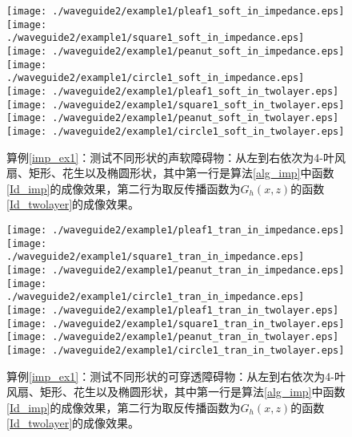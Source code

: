 \begin{figure}[h]
  \centering
  \texttt{[image: ./waveguide2/example1/pleaf1\_soft\_in\_impedance.eps]}
  \texttt{[image: ./waveguide2/example1/square1\_soft\_in\_impedance.eps]}
  \texttt{[image: ./waveguide2/example1/peanut\_soft\_in\_impedance.eps]}{\tiny }
  \texttt{[image: ./waveguide2/example1/circle1\_soft\_in\_impedance.eps]}\\
  \texttt{[image: ./waveguide2/example1/pleaf1\_soft\_in\_twolayer.eps]}
  \texttt{[image: ./waveguide2/example1/square1\_soft\_in\_twolayer.eps]}
  \texttt{[image: ./waveguide2/example1/peanut\_soft\_in\_twolayer.eps]}
  \texttt{[image: ./waveguide2/example1/circle1\_soft\_in\_twolayer.eps]}
  \caption{算例\ref{imp_ex1}：测试不同形状的声软障碍物：从左到右依次为4-叶风扇、矩形、花生以及椭圆形状，其中第一行是算法\ref{alg_imp}中函数\ref{Id_imp}的成像效果，第二行为取反传播函数为$G_h(x,z)$的函数\ref{Id_twolayer}的成像效果。}\label{fig_imp_ex1_1}
\end{figure}
\begin{figure}[h]
	\centering
	\texttt{[image: ./waveguide2/example1/pleaf1\_tran\_in\_impedance.eps]}
	\texttt{[image: ./waveguide2/example1/square1\_tran\_in\_impedance.eps]}
	\texttt{[image: ./waveguide2/example1/peanut\_tran\_in\_impedance.eps]}
	\texttt{[image: ./waveguide2/example1/circle1\_tran\_in\_impedance.eps]}\\
	\texttt{[image: ./waveguide2/example1/pleaf1\_tran\_in\_twolayer.eps]}
	\texttt{[image: ./waveguide2/example1/square1\_tran\_in\_twolayer.eps]}
	\texttt{[image: ./waveguide2/example1/peanut\_tran\_in\_twolayer.eps]}
	\texttt{[image: ./waveguide2/example1/circle1\_tran\_in\_twolayer.eps]}
	\caption{算例\ref{imp_ex1}：测试不同形状的可穿透障碍物：从左到右依次为4-叶风扇、矩形、花生以及椭圆形状，其中第一行是算法\ref{alg_imp}中函数\ref{Id_imp}的成像效果，第二行为取反传播函数为$G_h(x,z)$的函数\ref{Id_twolayer}的成像效果。}\label{fig_imp_ex1_2}
\end{figure}
